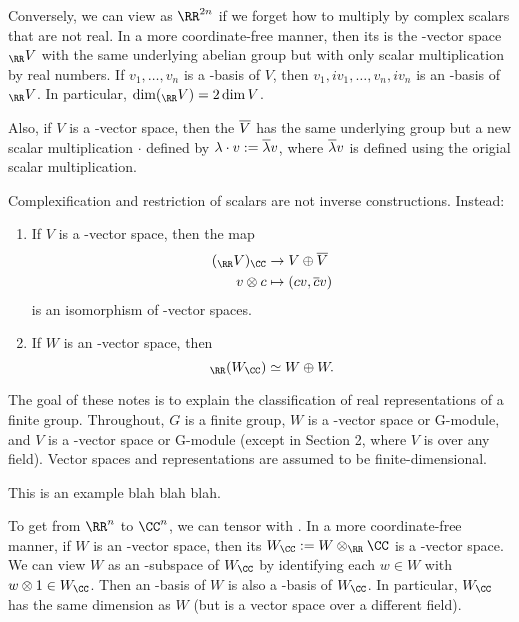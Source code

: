 \documentclass{scrartcl}
\begin{document}
Conversely, we can view \CC[n] as $\RR^{2n}$ if we forget how to multiply by complex scalars that are not real. In a more coordinate-free manner, then its  is the \RR-vector space $_{\RR} V$ with the same underlying abelian group but with only scalar multiplication by real numbers. If $v_1,\dots,v_n$ is a \CC-basis of $V$, then $v_1, iv_1,\dots,v_n,iv_n$ is an \RR-basis of $_{\RR} V$. In particular, $\dim(_{\RR} V) = 2\dim V$.

Also, if $V$ is a \CC-vector space, then the  $\overline{V}$ has the same underlying group but a new scalar multiplication $\cdot$ defined by $\lambda\cdot v := \overline{\lambda}v$, where $\overline{\lambda}v$ is defined using the origial scalar multiplication.

Complexification and restriction of scalars are not inverse constructions. Instead:
\begin{proposition}
    \hfill
    \begin{enumerate}[font=\normalfont]
        \item If $V$ is a \CC-vector space, then the map \begin{align*}
            (_{\RR} V)_{\CC} &\rightarrow V \oplus \ol{V} \\
            v\otimes c &\mapsto (cv,\ol{c}v) \\
        \end{align*} is an isomorphism of \CC-vector spaces.
        \item If $W$ is an \RR-vector space, then \[_{\RR}(W_{\CC}) \simeq W\oplus W.\]
    \end{enumerate}
\end{proposition}


The goal of these notes is to explain the classification of real representations of a finite
group. Throughout, $G$ is a finite group, $W$ is a \RR-vector space or \RR G-module, and $V$ is a
\CC-vector space or \CC G-module (except in Section 2, where $V$ is over any field). Vector spaces
and representations are assumed to be finite-dimensional.

\begin{example}
    This is an example blah blah blah. 
\end{example}

To get from $\RR^n$ to $\CC^n$, we can tensor with \CC. In a more coordinate-free
manner, if $W$ is an \RR-vector space, then its  $W_{\CC} := W \otimes_{\RR} \CC$ is a \CC-vector
space. We can view $W$ as an \RR-subspace of $W_{\CC}$ by identifying each $w \in W$ with $w \otimes 1 \in W_{\CC}$.
Then an \RR-basis of $W$ is also a \CC-basis of $W_{\CC}$. In particular, $W_{\CC}$ has the same dimension as
$W$ (but is a vector space over a different field).
\end{document}
